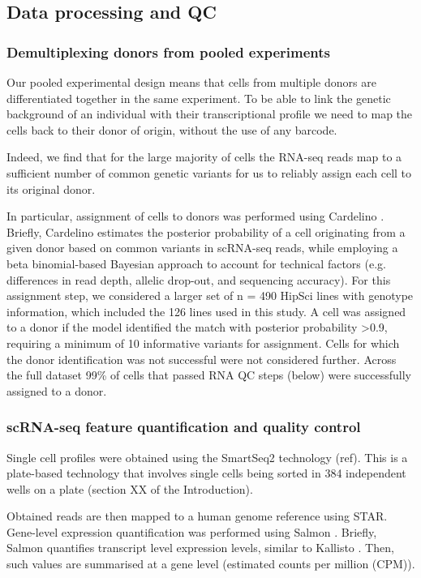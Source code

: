 \subsection{Data processing and QC}

\subsubsection{Demultiplexing donors from pooled experiments} 

Our pooled experimental design means that cells from multiple donors are differentiated together in the same experiment. 
To be able to link the genetic background of an individual with their transcriptional profile we need to map the cells back to their donor of origin, without the use of any barcode.

Indeed, we find that for the large majority of cells the RNA-seq reads map to a sufficient number of common genetic variants for us to reliably assign each cell to its original donor.

In particular, assignment of cells to donors was performed using Cardelino \cite{mccarthy2020cardelino}. 
Briefly, Cardelino estimates the posterior probability of a cell originating from a given donor based on common variants in scRNA-seq reads, while employing a beta binomial-based Bayesian approach to account for technical factors (e.g. differences in read depth, allelic drop-out, and sequencing accuracy). 
For this assignment step, we considered a larger set of n = 490 HipSci lines with genotype information, which included the 126 lines used in this study. 
A cell was assigned to a donor if the model identified the match with posterior probability >0.9, requiring a minimum of 10 informative variants for assignment. 
Cells for which the donor identification was not successful were not considered further.
Across the full dataset 99\% of cells that passed RNA QC steps (below) were successfully assigned to a donor.

\subsubsection{scRNA-seq feature quantification and quality control}

Single cell profiles were obtained using the SmartSeq2 technology (ref). 
This is a plate-based technology that involves single cells being sorted in 384 independent wells on a plate (section XX of the Introduction). 

Obtained reads are then mapped to a human genome reference using STAR. 
Gene-level expression quantification was performed using Salmon \cite{patro2017salmon}. 
Briefly, Salmon quantifies transcript level expression levels, similar to Kallisto \cite{bray2016near}.
Then, such values are summarised at a gene level (estimated counts per million (CPM)).


